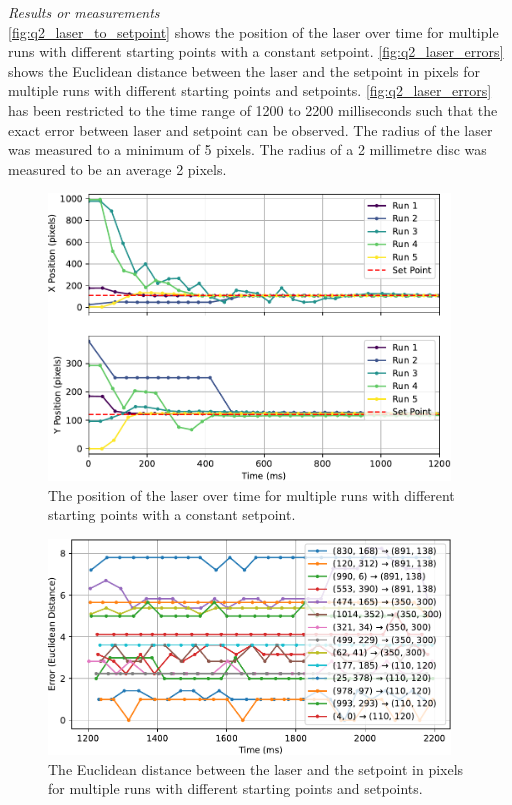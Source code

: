 \textit{Results or measurements}\\
\autoref{fig:q2_laser_to_setpoint} shows the position of the laser over time for multiple runs with different starting points with a constant setpoint. \autoref{fig:q2_laser_errors} shows the Euclidean distance between the laser and the setpoint in pixels for multiple runs with different starting points and setpoints. \autoref{fig:q2_laser_errors} has been restricted to the time range of 1200 to 2200 milliseconds such that the exact error between laser and setpoint can be observed. The radius of the laser was measured to a minimum of 5 pixels. The radius of a 2 millimetre disc was measured to be an average 2 pixels.
\begin{figure}[!htb]
  \centering
  \includegraphics[width=0.95\textwidth]{figures/results/q2.pdf}
  \caption{The position of the laser over time for multiple runs with different starting points with a constant setpoint.}
  \label{fig:q2_laser_to_setpoint}
\end{figure}
\begin{figure}[!htb]
  \centering
  \includegraphics[width=0.95\textwidth]{figures/results/q2_errors.pdf}
  \caption{The Euclidean distance between the laser and the setpoint in pixels for multiple runs with different starting points and setpoints.}
  \label{fig:q2_laser_errors}
\end{figure}

